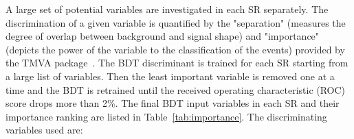 A large set of potential variables are investigated in each SR separately. The discrimination of a given variable is quantified by the "separation" (measures the degree of overlap between background and signal shape) and "importance" (depicts the power of the variable to the classification of the events) provided by the TMVA package~\cite{Hocker:2007ht}.
The BDT discriminant is trained for each SR starting from a large list of variables. Then the least important variable is removed one at a time and the BDT is retrained until the
received operating characteristic (ROC) score drops more than 2\%.
The final BDT input variables in each SR and their importance ranking are listed in Table~\ref{tab:importance}. The discriminating variables used are:
